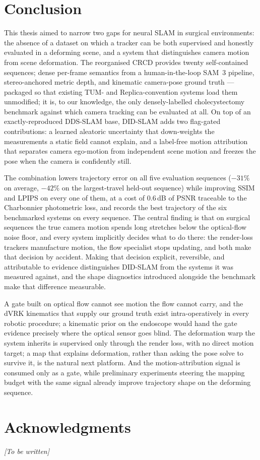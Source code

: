 \documentclass{article}
\begin{document}
\section{Conclusion}
\label{sec:conclusion}
This thesis aimed to narrow two gaps for neural SLAM in surgical environments: the absence of a dataset on which a tracker can be both supervised and honestly evaluated in a deforming scene, and a system that distinguishes camera motion from scene deformation. The reorganised CRCD provides twenty self-contained sequences; dense per-frame semantics from a human-in-the-loop SAM~3 pipeline, stereo-anchored metric depth, and kinematic camera-pose ground truth --- packaged so that existing TUM- and Replica-convention systems load them unmodified; it is, to our knowledge, the only densely-labelled cholecystectomy benchmark against which camera tracking can be evaluated at all. On top of an exactly-reproduced DDS-SLAM base, DID-SLAM adds two flag-gated contributions: a learned aleatoric uncertainty that down-weights the measurements a static field cannot explain, and a label-free motion attribution that separates camera ego-motion from independent scene motion and freezes the pose when the camera is confidently still.

The combination lowers trajectory error on all five evaluation sequences ($-31\%$ on average, $-42\%$ on the largest-travel held-out sequence) while improving SSIM and LPIPS on every one of them, at a cost of $0.6$\,dB of PSNR traceable to the Charbonnier photometric loss, and records the best trajectory of the six benchmarked systems on every sequence. The central finding is that on surgical sequences the true camera motion spends long stretches below the optical-flow noise floor, and every system implicitly decides what to do there: the render-loss trackers manufacture motion, the flow specialist stops updating, and both make that decision by accident. Making that decision explicit, reversible, and attributable to evidence distinguishes DID-SLAM from the systems it was measured against, and the shape diagnostics introduced alongside the benchmark make that difference measurable.

A gate built on optical flow cannot see motion the flow cannot carry, and the dVRK kinematics that supply our ground truth exist intra-operatively in every robotic procedure; a kinematic prior on the endoscope would hand the gate evidence precisely where the optical sensor goes blind. The deformation warp the system inherits is supervised only through the render loss, with no direct motion target; a map that explains deformation, rather than asking the pose solve to survive it, is the natural next platform. And the motion-attribution signal is consumed only as a gate, while preliminary experiments steering the mapping budget with the same signal already improve trajectory shape on the deforming sequence.


\section{Acknowledgments}
\emph{[To be written]}



\end{document}
